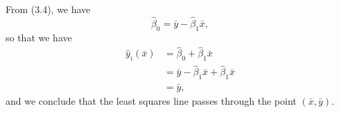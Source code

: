From (3.4), we have
\[
    \hat{\beta}_0 = \bar{y} - \hat{\beta}_1 \bar{x},
\]
so that we have
\begin{equation*}
    \begin{split}
        \hat{y}_i(\bar{x}) &= \hat{\beta}_0 + \hat{\beta}_1 \bar{x} \\
        &= \bar{y} - \hat{\beta}_1 \bar{x} +
        \hat{\beta}_1 \bar{x} \\
        &= \bar{y},
    \end{split}
\end{equation*}
and we conclude that the least squares line passes through the point
$(\bar{x}, \bar{y})$.
